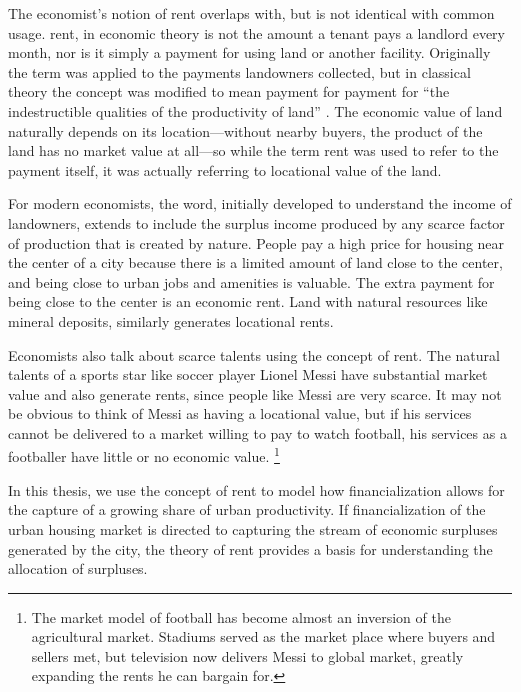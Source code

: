 The economist's notion of rent  overlaps with, but is not identical with common usage. \Gls{rent}, in economic theory is not the amount a tenant pays a landlord every month, nor is it simply a payment for using land or another facility. Originally the term was applied to the payments landowners collected, but in classical theory the concept was modified to mean payment for payment for ``the indestructible qualities of the productivity of land'' \cite{Gray1914RentUT}. The economic value of land naturally depends on its location---without  nearby buyers, the product of the land has no market value at all---so while the term rent was used to refer to the payment itself, it was actually referring to locational value of the land. %

For modern economists, the word, initially developed to understand the income of landowners, extends to include the \gls{surplus} income produced by any scarce factor of production that is created by nature. %
People pay a high price for housing near the center of a city because there is a limited amount of land close to the center, and being close to urban jobs and amenities is valuable. The extra payment for being close to the center is an \gls{economic rent}. Land with natural resources like mineral deposits, similarly generates locational rents. 

Economists also talk about scarce talents using the concept of rent.  The natural talents of a sports star like soccer player Lionel Messi have substantial market value and also generate rents, since people like Messi are very scarce. It may not be obvious to think of Messi as having a locational value, but if his services cannot be delivered to a market willing to pay to watch football, his services as a footballer have little or no economic value.%
\footnote{The market model of football has become almost an inversion of the agricultural market. Stadiums served as the market place where buyers and sellers met, but television now delivers Messi to global market, greatly expanding the rents he can bargain for.} 

In this thesis, we use the concept of rent to model how financialization allows for the capture of a growing share of urban productivity. %
If financialization of the urban housing market is directed to capturing the stream of economic surpluses generated by the city, the theory of rent provides a basis for understanding the allocation of surpluses.

